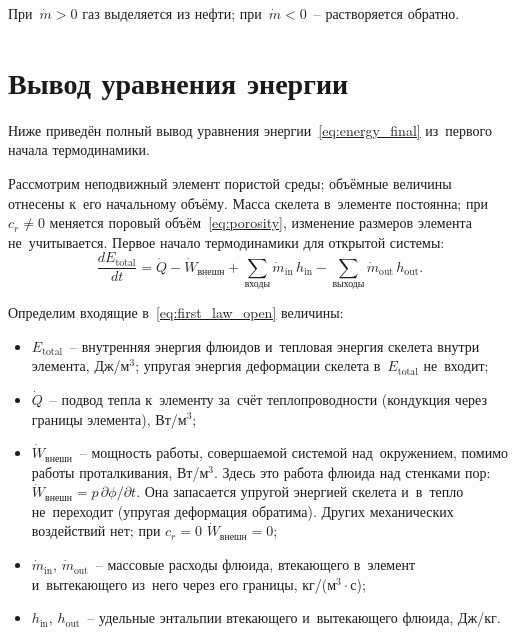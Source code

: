\documentclass[12pt,a4paper]{article}
\newcommand{\mdot}{\dot{m}}
\begin{document}
При~$\mdot > 0$ газ выделяется из нефти; при~$\mdot < 0$~--
растворяется обратно.


\section{Вывод уравнения энергии}\label{app:energy_derivation}

Ниже приведён полный вывод уравнения
энергии~\eqref{eq:energy_final} из~первого начала термодинамики.

Рассмотрим неподвижный элемент пористой среды; объёмные величины
отнесены к~его начальному объёму. Масса скелета в~элементе постоянна;
при $c_r \ne 0$ меняется поровый объём~\eqref{eq:porosity}, изменение
размеров элемента не~учитывается. Первое начало
термодинамики для открытой системы:
\begin{equation}\label{eq:first_law_open}
  \frac{dE_{\mathrm{total}}}{dt}
  = \dot{Q} - \dot{W}_{\text{внешн}}
    + \sum_{\text{входы}} \dot{m}_{\mathrm{in}}\,h_{\mathrm{in}}
    - \sum_{\text{выходы}} \dot{m}_{\mathrm{out}}\,h_{\mathrm{out}}.
\end{equation}

Определим входящие в~\eqref{eq:first_law_open} величины:
\begin{itemize}[nosep]
  \item $E_{\mathrm{total}}$~-- внутренняя энергия флюидов и~тепловая
        энергия скелета внутри элемента, Дж/м$^3$; упругая энергия
        деформации скелета в~$E_{\mathrm{total}}$ не~входит;
  \item $\dot{Q}$~-- подвод тепла к~элементу за~счёт теплопроводности
        (кондукция через границы элемента), Вт/м$^3$;
  \item $\dot{W}_{\text{внешн}}$~-- мощность работы, совершаемой
        системой над~окружением, помимо работы проталкивания, Вт/м$^3$.
        Здесь это работа флюида над стенками пор:
        $\dot{W}_{\text{внешн}} = p\,\partial\phi/\partial t$. Она
        запасается упругой энергией скелета и~в~тепло не~переходит
        (упругая деформация обратима). Других механических воздействий
        нет; при $c_r = 0$ $\dot{W}_{\text{внешн}} = 0$;
  \item $\dot{m}_{\mathrm{in}}$, $\dot{m}_{\mathrm{out}}$~-- массовые
        расходы флюида, втекающего в~элемент и~вытекающего из~него
        через его границы, кг/(м$^3\cdot$с);
  \item $h_{\mathrm{in}}$, $h_{\mathrm{out}}$~-- удельные энтальпии
        втекающего и~вытекающего флюида, Дж/кг.
\end{itemize}
\end{document}
